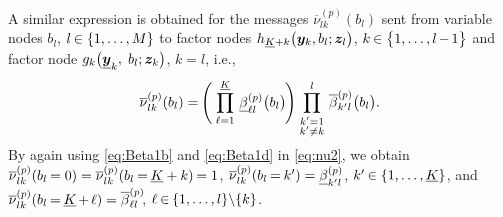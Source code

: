 \documentclass[10pt, twoside, romanappendices]{IEEEtran}
\providecommand{\ist}{\hspace*{.3mm}}
\providecommand{\rmv}{\hspace*{-.3mm}}
\providecommand{\nn}{\nonumber}
\begin{document}
A similar expression is obtained for the messages $\overline{\nu}^{(p)}_{l k}(b_l)$ sent from variable nodes $b_{l}$, $l \rmv\in \{1,\dots,M\}$ to factor nodes $h_{\underline{K}+k}\big( \bm{y}_{k}, b_{l}; \bm{z}_l \big)$, $k \rmv\in \big\{1,\dots, l \rmv-\rmv1\big\}$ and factor node $g_{k}\big( \underline{\bm{y}}_{k},$ $b_{l}; \bm{z}_k \big)$, $k = l$, i.e.,\vspace{.4mm}
\begin{align}
&\overline{\nu}^{(p)}_{l k}(b_l) =\rmv \Bigg( \ist \prod^{\underline{K}}_{\substack{\ell=1}}  \ist\ist \underline{\beta}^{(p)}_{\ell l}\big(b_{l}\big) \rmv \Bigg) \ist \prod^{l}_{\substack{k'=1\\k' \neq k}} \ist\ist \overline{\beta}^{(p)}_{k' l}\big(b_{l}\big). \label{eq:nu2} \\[-6mm]
&\nn
\end{align}
By again using \eqref{eq:Beta1b} and \eqref{eq:Beta1d} in \eqref{eq:nu2}, we obtain $\overline{\nu}^{(p)}_{l k}(b_l \rmv= 0) = \overline{\nu}^{(p)}_{l k}(b_l \rmv=\rmv \underline{K} + k) \rmv= 1$, $\overline{\nu}^{(p)}_{l k}(b_l \rmv=\rmv k') = \underline{\beta}^{(p)}_{k' l}$, $k' \rmv\in \{1,\dots,\underline{K}\}$, and $\overline{\nu}^{(p)}_{l k}(b_l \rmv=\rmv \underline{K} \rmv+\rmv \ell) = \overline{\beta}^{(p)}_{\ell l}\rmv\rmv\rmv$, $\ell \rmv\in\rmv \{1,\dots,l\} \backslash \{k\}$.
\end{document}

